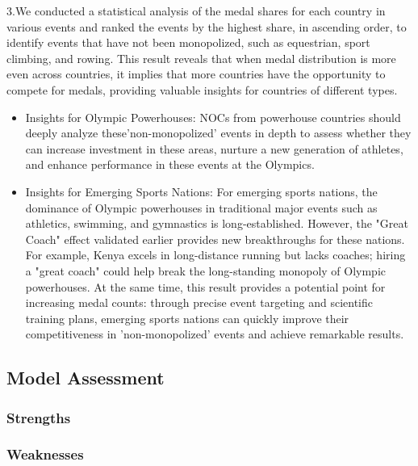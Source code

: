 \documentclass{mcmthesis}
\begin{document}
    3.We conducted a statistical analysis of the medal shares for each country in various events and ranked the events by the highest share, in ascending order, to identify events that have not been monopolized, such as equestrian, sport climbing, and rowing. This result reveals that when medal distribution is more even across countries, it implies that more countries have the opportunity to compete for medals, providing valuable insights for countries of different types.

\begin{itemize}   
    \item Insights for Olympic Powerhouses: NOCs from powerhouse countries should deeply analyze these'non-monopolized' events in depth to assess whether they can increase investment in these areas, nurture a new generation of athletes, and enhance performance in these events at the Olympics.
    \item Insights for Emerging Sports Nations: For emerging sports nations, the dominance of Olympic powerhouses in traditional major events such as athletics, swimming, and gymnastics is long-established. However, the "Great Coach" effect validated earlier provides new breakthroughs for these nations. For example, Kenya excels in long-distance running but lacks coaches; hiring a "great coach" could help break the long-standing monopoly of Olympic powerhouses. At the same time, this result provides a potential point for increasing medal counts: through precise event targeting and scientific training plans, emerging sports nations can quickly improve their competitiveness in 'non-monopolized' events and achieve remarkable results.
\end{itemize} 


\subsection{Model Assessment}

\subsubsection{Strengths}
\subsubsection{Weaknesses}
\end{document}
